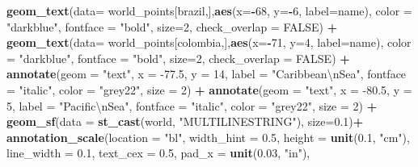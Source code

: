 \documentclass[12pt,twoside]{reedthesis}
\newenvironment{Shaded}{\begin{snugshade}}{\end{snugshade}}
\newcommand{\CharTok}[1]{\textcolor[rgb]{0.31,0.60,0.02}{#1}}
\newcommand{\DataTypeTok}[1]{\textcolor[rgb]{0.13,0.29,0.53}{#1}}
\newcommand{\DecValTok}[1]{\textcolor[rgb]{0.00,0.00,0.81}{#1}}
\newcommand{\FloatTok}[1]{\textcolor[rgb]{0.00,0.00,0.81}{#1}}
\newcommand{\KeywordTok}[1]{\textcolor[rgb]{0.13,0.29,0.53}{\textbf{#1}}}
\newcommand{\NormalTok}[1]{#1}
\newcommand{\OperatorTok}[1]{\textcolor[rgb]{0.81,0.36,0.00}{\textbf{#1}}}
\newcommand{\OtherTok}[1]{\textcolor[rgb]{0.56,0.35,0.01}{#1}}
\newcommand{\StringTok}[1]{\textcolor[rgb]{0.31,0.60,0.02}{#1}}
\begin{document}
\begin{Shaded}
\begin{Highlighting}[]
\StringTok{  }\KeywordTok{geom_text}\NormalTok{(}\DataTypeTok{data=}\NormalTok{ world_points[brazil,],}\KeywordTok{aes}\NormalTok{(}\DataTypeTok{x=}\OperatorTok{-}\DecValTok{68}\NormalTok{, }\DataTypeTok{y=}\OperatorTok{-}\DecValTok{6}\NormalTok{, }\DataTypeTok{label=}\NormalTok{name), }\DataTypeTok{color =} \StringTok{"darkblue"}\NormalTok{, }\DataTypeTok{fontface =} \StringTok{"bold"}\NormalTok{, }\DataTypeTok{size=}\DecValTok{2}\NormalTok{, }\DataTypeTok{check_overlap =} \OtherTok{FALSE}\NormalTok{) }\OperatorTok{+}
\StringTok{  }\KeywordTok{geom_text}\NormalTok{(}\DataTypeTok{data=}\NormalTok{ world_points[colombia,],}\KeywordTok{aes}\NormalTok{(}\DataTypeTok{x=}\OperatorTok{-}\DecValTok{71}\NormalTok{, }\DataTypeTok{y=}\DecValTok{4}\NormalTok{, }\DataTypeTok{label=}\NormalTok{name), }\DataTypeTok{color =} \StringTok{"darkblue"}\NormalTok{, }\DataTypeTok{fontface =} \StringTok{"bold"}\NormalTok{, }\DataTypeTok{size=}\DecValTok{2}\NormalTok{, }\DataTypeTok{check_overlap =} \OtherTok{FALSE}\NormalTok{) }\OperatorTok{+}
\StringTok{  }\KeywordTok{annotate}\NormalTok{(}\DataTypeTok{geom =} \StringTok{"text"}\NormalTok{, }\DataTypeTok{x =} \FloatTok{-77.5}\NormalTok{, }\DataTypeTok{y =} \DecValTok{14}\NormalTok{, }\DataTypeTok{label =} \StringTok{"Caribbean}\CharTok{\textbackslash{}n}\StringTok{Sea"}\NormalTok{, }\DataTypeTok{fontface =} \StringTok{"italic"}\NormalTok{, }\DataTypeTok{color =} \StringTok{"grey22"}\NormalTok{, }\DataTypeTok{size =} \DecValTok{2}\NormalTok{) }\OperatorTok{+}\StringTok{ }
\StringTok{  }\KeywordTok{annotate}\NormalTok{(}\DataTypeTok{geom =} \StringTok{"text"}\NormalTok{, }\DataTypeTok{x =} \FloatTok{-80.5}\NormalTok{, }\DataTypeTok{y =} \DecValTok{5}\NormalTok{, }\DataTypeTok{label =} \StringTok{"Pacific}\CharTok{\textbackslash{}n}\StringTok{Sea"}\NormalTok{, }\DataTypeTok{fontface =} \StringTok{"italic"}\NormalTok{, }\DataTypeTok{color =} \StringTok{"grey22"}\NormalTok{, }\DataTypeTok{size =} \DecValTok{2}\NormalTok{) }\OperatorTok{+}
\StringTok{  }\KeywordTok{geom_sf}\NormalTok{(}\DataTypeTok{data =} \KeywordTok{st_cast}\NormalTok{(world, }\StringTok{"MULTILINESTRING"}\NormalTok{), }\DataTypeTok{size=}\FloatTok{0.1}\NormalTok{)}\OperatorTok{+}
\StringTok{  }\KeywordTok{annotation_scale}\NormalTok{(}\DataTypeTok{location =} \StringTok{"bl"}\NormalTok{, }\DataTypeTok{width_hint =} \FloatTok{0.5}\NormalTok{, }\DataTypeTok{height =} \KeywordTok{unit}\NormalTok{(}\FloatTok{0.1}\NormalTok{, }\StringTok{"cm"}\NormalTok{), }\DataTypeTok{line_width =} \FloatTok{0.1}\NormalTok{, }\DataTypeTok{text_cex =} \FloatTok{0.5}\NormalTok{, }\DataTypeTok{pad_x =} \KeywordTok{unit}\NormalTok{(}\FloatTok{0.03}\NormalTok{, }\StringTok{"in"}\NormalTok{), }

\end{Highlighting}
\end{Shaded}
\end{document}
